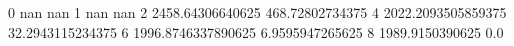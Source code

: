 0 nan nan
1 nan nan
2 2458.64306640625 468.72802734375
4 2022.2093505859375 32.2943115234375
6 1996.8746337890625 6.9595947265625
8 1989.9150390625 0.0
